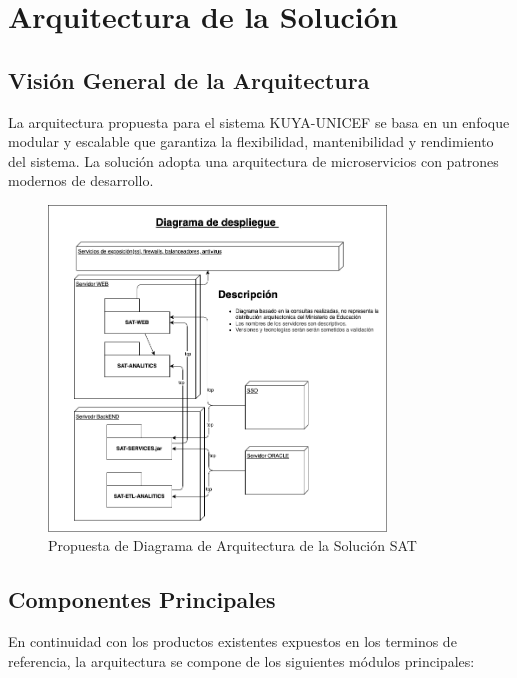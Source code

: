 \section{Arquitectura de la Solución}

\subsection{Visión General de la Arquitectura}

La arquitectura propuesta para el sistema KUYA-UNICEF se basa en un enfoque modular y escalable que garantiza la flexibilidad, mantenibilidad y rendimiento del sistema. La solución adopta una arquitectura de microservicios con patrones modernos de desarrollo.

\begin{figure}[h]
\centering
\includegraphics[width=0.8\textwidth]{graficos/arquitectura.png}
\caption{Propuesta de Diagrama de Arquitectura de la Solución SAT}
\label{fig:arquitectura}
\end{figure}

\subsection{Componentes Principales}
En continuidad con los productos existentes expuestos en los terminos de referencia, la arquitectura se compone de los siguientes módulos principales:


